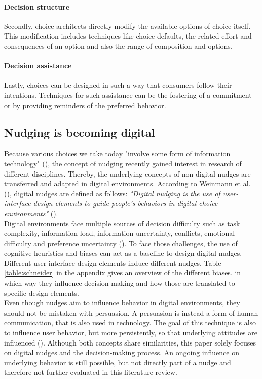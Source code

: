 \paragraph{Decision structure}
Secondly, choice architects directly modify the available options of choice itself. This modification includes techniques like choice defaults, the related effort and consequences of an option and also the range of composition and options.
\paragraph{Decision assistance}
Lastly, choices can be designed in such a way that consumers follow their intentions. Techniques for such assistance can be the fostering of a commitment or by providing reminders of the preferred behavior.

\subsection{Nudging is becoming digital}
Because various choices we take today "involve some form of information technology" (\cite[p.490]{johnson_beyond_2012}), the concept of nudging recently gained interest in research of different disciplines. Thereby, the underlying concepts of non-digital nudges are transferred and adapted in digital environments. According to Weinmann et al.  (\citeyear{weinmann_digital_2016}), digital nudges are defined as follows:
\textit{"Digital nudging is the use of user-interface design elements to guide people's behaviors in digital choice environments"} (\cite[p.433]{weinmann_digital_2016}).
\\

Digital environments face multiple sources of decision difficulty such as task complexity, information load, information uncertainty, conflicts, emotional difficulty and preference uncertainty (\cite{broniarczyk_decision_2014}). To face those challenges, the use of cognitive heuristics and biases can act as a baseline to design digital nudges. Different user-interface design elements induce different nudges. Table \ref{table:schneider} in the appendix gives an overview of the different biases, in which way they influence decision-making and how those are translated to specific design elements.
\\

Even though nudges aim to influence behavior in digital environments, they should not be mistaken with persuasion. A persuasion is instead a form of human communication, that is also used in technology. The goal of this technique is also to influence user behavior, but more persistently, so that underlying attitudes are influenced (\cite{oinas-kukkonen_persuasive_2009}). Although both concepts share similarities, this paper solely focuses on digital nudges and the decision-making process. An ongoing influence on underlying behavior is still possible, but not directly part of a nudge and therefore not further evaluated in this literature review.

